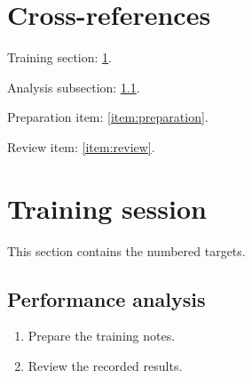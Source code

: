 \documentclass[a4paper,12pt]{article}
\begin{document}
\section*{Cross-references}

Training section: \ref{sec:training}.

Analysis subsection: \ref{subsec:analysis}.

Preparation item: \ref{item:preparation}.

Review item: \ref{item:review}.


\section{Training session}
\label{sec:training}

This section contains the numbered targets.


\subsection{Performance analysis}
\label{subsec:analysis}

\begin{enumerate}

    \item
    \label{item:preparation}
    Prepare the training notes.

    \item
    \label{item:review}
    Review the recorded results.
\end{enumerate}
\end{document}
